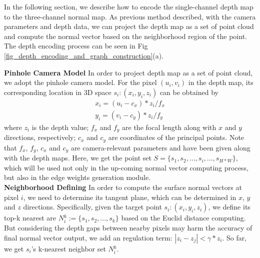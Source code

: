 ﻿\documentclass[journal]{IEEEtran}
\begin{document}
 
    In the following section, we describe how to encode the single-channel depth map to the three-channel normal map. As previous method \cite{yin2018geonet} described, with the camera parameters and depth data, we can project the depth map as a set of point cloud and compute the normal vector based on the neighborhood region of the point. The depth encoding process can be seen in Fig \ref{fig_depth_encoding_and_graph_construction}(a).
 
    \textbf{Pinhole Camera Model}  In order to project depth map as a set of point cloud, we adopt the pinhole camera model. For the pixel $(u_{i},v_{i})$ in the depth map, its corresponding location in 3D space $\mathit{s_{i}}:(x_{i},y_{i},z_{i})$ can be obtained by
    \begin{equation}
        \begin{split}
        x_{i} = (u_{i} - c_{x})*z_{i}/f_{x}\\
        y_{i} = (v_{i} - c_{y})*z_{i}/f_{y}
        \end{split}
    \end{equation}
    where $z_{i}$ is the depth value; $f_{x}$ and $f_{y}$ are the focal length along with $x$ and $y$ directions, respectively; $c_{x}$ and $c_{y}$ are coordinates of the principal points. Note that $f_{x}$, $f_{y}$, $c_{x}$ and $c_{y}$ are camera-relevant parameters and have been given along with the depth maps. Here, we get the point set ${S}=\{ {s_{1}}, {s_{2}}, ..., {s_{i}} , ...  , {s_{H*W}} \}$, which will be used not only in the up-coming normal vector computing process, but also in the edge weights generation module.
    \\   
    
 
    \textbf{Neighborhood Defining}  In order to compute the surface normal vectors at pixel $i$, we need to determine its tangent plane, which can be determined in $x$, $y$ and $z$ directions. Specifically, given the target point ${s_{i}}:(x_{i},y_{i},z_{i})$, we define its top-k nearest are $N{_i^k}:=  \{ s_{1}, s_{2}, ..., s_k\}$ based on the Euclid distance computing. But considering the depth gaps between nearby pixels may harm the accuracy of final normal vector output, we add an regulation term: $ |z_{i} - z_{j} | < \gamma *z_{i} $. So far, we get ${s_{i}}$'s k-nearest neighbor set $N{_i^k}$. \\   
    
    
 
\end{document}
